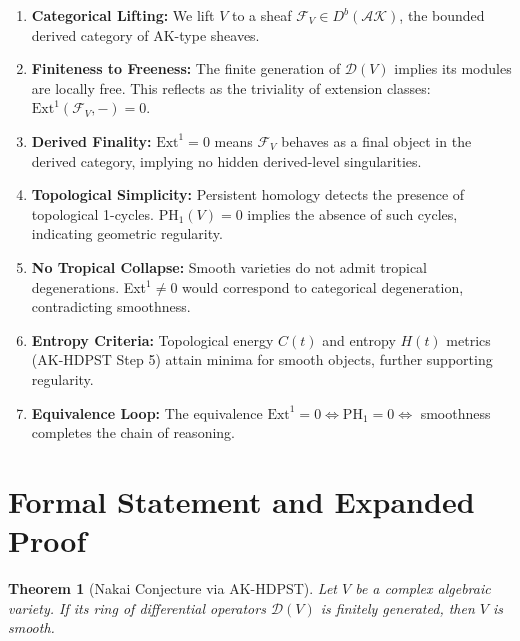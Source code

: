 \documentclass[11pt]{article}
\newtheorem{theorem}{Theorem}[section]
\begin{document}
\begin{enumerate}
  \item \textbf{Categorical Lifting:} We lift $V$ to a sheaf $\mathcal{F}_V \in D^b(\mathcal{AK})$, the bounded derived category of AK-type sheaves.
  \item \textbf{Finiteness to Freeness:} The finite generation of $\mathcal{D}(V)$ implies its modules are locally free. This reflects as the triviality of extension classes: $\mathrm{Ext}^1(\mathcal{F}_V, -) = 0$.
  \item \textbf{Derived Finality:} $\mathrm{Ext}^1 = 0$ means $\mathcal{F}_V$ behaves as a final object in the derived category, implying no hidden derived-level singularities.
  \item \textbf{Topological Simplicity:} Persistent homology detects the presence of topological 1-cycles. $\mathrm{PH}_1(V) = 0$ implies the absence of such cycles, indicating geometric regularity.
  \item \textbf{No Tropical Collapse:} Smooth varieties do not admit tropical degenerations. Ext$^1 \neq 0$ would correspond to categorical degeneration, contradicting smoothness.
  \item \textbf{Entropy Criteria:} Topological energy $C(t)$ and entropy $H(t)$ metrics (AK-HDPST Step 5) attain minima for smooth objects, further supporting regularity.
  \item \textbf{Equivalence Loop:} The equivalence $\mathrm{Ext}^1 = 0 \iff \mathrm{PH}_1 = 0 \iff$ smoothness completes the chain of reasoning.
\end{enumerate}

\section{Formal Statement and Expanded Proof}

\begin{theorem}[Nakai Conjecture via AK-HDPST]
Let $V$ be a complex algebraic variety. If its ring of differential operators $\mathcal{D}(V)$ is finitely generated, then $V$ is smooth.
\end{theorem}
\end{document}
